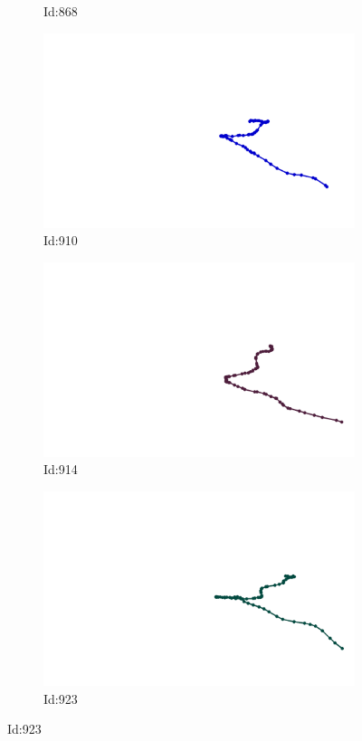\documentclass[12pt,twoside]{report}
\begin{document}
\begin{figure}
\begin{subfigure}[b]{0.20\textwidth}
\caption{Id:868}
\end{subfigure}
\begin{subfigure}[b]{0.20\textwidth}
\centering
\includegraphics[width=\textwidth]{../trajectories/910.png}
\caption{Id:910}
\end{subfigure}
\begin{subfigure}[b]{0.20\textwidth}
\centering
\includegraphics[width=\textwidth]{../trajectories/914.png}
\caption{Id:914}
\end{subfigure}
\begin{subfigure}[b]{0.20\textwidth}
\centering
\includegraphics[width=\textwidth]{../trajectories/923.png}
\caption{Id:923}
\end{subfigure}
\end{figure}
\end{document}
